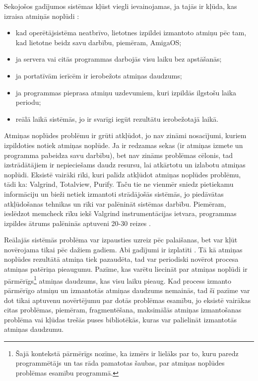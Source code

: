 Sekojošos gadījumos sistēmas kļūst viegli ievainojamas, ja tajās ir kļūda, kas izraisa atmiņās noplūdi \cite{RTTV}: 
\begin{itemize}
\item { kad operētājsistēma neatbrīvo, lietotnes izpildei izmantoto atmiņu pēc tam, kad lietotne beidz savu darbību, piemēram, AmigaOS;}
\item { ja servera vai citās programmas darbojās visu laiku bez apstāšanās; }
\item { ja portatīvām ierīcēm ir ierobežots atmiņas daudzums;}
\item { ja programmas pieprasa atmiņu uzdevumiem, kuri izpildās ilgstošu laika periodu; }
\item { reālā laikā sistēmās, jo ir svarīgi iegūt rezultātu ierobežotajā laikā. }
\end{itemize}

Atmiņas noplūdes problēmu ir grūti atkļūdot,  jo nav zināmi nosacījumi, kuriem izpildoties notiek atmiņas noplūde. 
Ja ir redzamas sekas (ir atmiņas izmete un programma pabeidza savu darbību), bet nav zināms problēmas cēlonis, tad izstrādātājiem ir nepieciešams daudz resursu, lai atkārtotu un izlabotu atmiņas noplūdi. 
Eksistē vairāki rīki, kuri palīdz atkļūdot atmiņas noplūdes problēmu, tādi ka: Valgrind, Totalview, Purify. 
Taču tie ne vienmēr sniedz pietiekamu informāciju un bieži netiek izmantoti strādājošās sistēmās, jo piedāvātas atkļūdošanas tehnikas un rīki var palēnināt sistēmas darbību.
Piemēram, ieslēdzot  memcheck rīku iekš Valgrind instrumentācijas ietvara, programmas izpildes ātrums palēninās aptuveni 20-30 reizes \cite{UVD}.

Reālajās sistēmās problēma var izpausties uzreiz pēc palaišanas, bet var kļūt novērojama tikai pēc dažiem gadiem. 
Abi gadījumi ir izplatīti \cite{HTTM}.
Tā kā atmiņas noplūdes rezultātā atmiņa tiek pazaudēta, tad var periodiski novērot procesa atmiņas patēriņa pieaugumu.
Pazīme, kas varētu liecināt par atmiņas noplūdi ir pārmērīgs\footnote{Šajā kontekstā pārmērīgs nozīme, ka izmērs ir lielāks par to, kuru paredz programmētājs un tas rāda pamatotas šaubas, par atmiņas noplūdes problēmas esamību programmā.}
atmiņas daudzums, kas visu laiku pieaug. 
Kad process izmanto pārmērīgo atmiņu un izmantotās atmiņas daudzums nemainās, tad šī pazīme var dot tikai aptuvenu novērtējumu par dotās problēmas esamību, jo eksistē vairākas citas problēmas, piemēram, fragmentēšana, maksimālās atmiņas izmantošanas problēma vai kļūdas trešās puses bibliotēkās, kuras var palielināt izmantotās atmiņas daudzumu.


